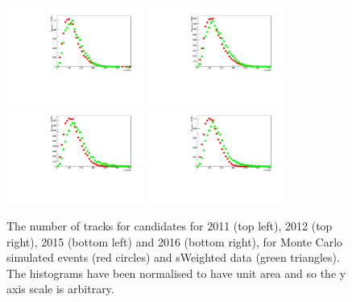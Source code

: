 \begin{figure}[ht]
  \centering
    \includegraphics[width=0.4\textwidth]{./Figs/LifetimeMeasurement/2011_nTracks_Bd2KPi_MC_data_comparison_Dec_triggers.pdf}
    \includegraphics[width=0.4\textwidth]{./Figs/LifetimeMeasurement/2012_nTracks_Bd2KPi_MC_data_comparison_Dec_triggers.pdf}
    \includegraphics[width=0.4\textwidth]{./Figs/LifetimeMeasurement/2015_nTracks_Bd2KPi_MC_data_comparison_Dec_triggers.pdf}
    \includegraphics[width=0.4\textwidth]{./Figs/LifetimeMeasurement/2016_nTracks_Bd2KPi_MC_data_comparison_Dec_triggers.pdf}
  \caption{The number of tracks for \bdkpi candidates for 2011 (top left), 2012 (top right), 2015 (bottom left) and 2016 (bottom right), for Monte Carlo simulated events (red circles) and sWeighted data (green triangles). The histograms have been normalised to have unit area and so the y axis scale is arbitrary.}
  \label{fig:nTracksMCDataComp}
\end{figure}
\FloatBarrier


